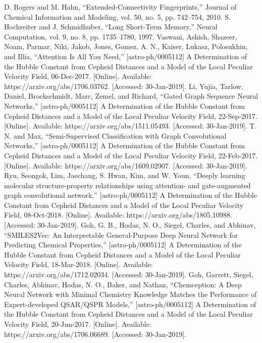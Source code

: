 \documentclass[conference]{IEEEtran}
\begin{document}
\begin{thebibliography}{}
	 D. Rogers and M. Hahn, “Extended-Connectivity Fingerprints,” Journal of Chemical Information and Modeling, vol. 50, no. 5, pp. 742–754, 2010.
	 S. Hochreiter and J. Schmidhuber, “Long Short-Term Memory,” Neural Computation, vol. 9, no. 8, pp. 1735–1780, 1997.
	 Vaswani, Ashish, Shazeer, Noam, Parmar, Niki, Jakob, Jones, Gomez, A. N., Kaiser, Lukasz, Polosukhin, and Illia, “Attention Is All You Need,” [astro-ph/0005112] A Determination of the Hubble Constant from Cepheid Distances and a Model of the Local Peculiar Velocity Field, 06-Dec-2017. [Online]. Available: https://arxiv.org/abs/1706.03762. [Accessed: 30-Jan-2019].
	 Li, Yujia, Tarlow, Daniel, Brockschmidt, Marc, Zemel, and Richard, “Gated Graph Sequence Neural Networks,” [astro-ph/0005112] A Determination of the Hubble Constant from Cepheid Distances and a Model of the Local Peculiar Velocity Field, 22-Sep-2017. [Online]. Available: https://arxiv.org/abs/1511.05493. [Accessed: 30-Jan-2019].
	 T. N. and Max, “Semi-Supervised Classification with Graph Convolutional Networks,” [astro-ph/0005112] A Determination of the Hubble Constant from Cepheid Distances and a Model of the Local Peculiar Velocity Field, 22-Feb-2017. [Online]. Available: https://arxiv.org/abs/1609.02907. [Accessed: 30-Jan-2019].
	 Ryu, Seongok, Lim, Jaechang, S. Hwan, Kim, and W. Youn, “Deeply learning molecular structure-property relationships using attention- and gate-augmented graph convolutional network,” [astro-ph/0005112] A Determination of the Hubble Constant from Cepheid Distances and a Model of the Local Peculiar Velocity Field, 08-Oct-2018. [Online]. Available: https://arxiv.org/abs/1805.10988. [Accessed: 30-Jan-2019].
	 Goh, G. B., Hodas, N. O., Siegel, Charles, and Abhinav, “SMILES2Vec: An Interpretable General-Purpose Deep Neural Network for Predicting Chemical Properties,” [astro-ph/0005112] A Determination of the Hubble Constant from Cepheid Distances and a Model of the Local Peculiar Velocity Field, 18-Mar-2018. [Online]. Available: https://arxiv.org/abs/1712.02034. [Accessed: 30-Jan-2019].
	 Goh, Garrett, Siegel, Charles, Abhinav, Hodas, N. O., Baker, and Nathan, “Chemception: A Deep Neural Network with Minimal Chemistry Knowledge Matches the Performance of Expert-developed QSAR/QSPR Models,” [astro-ph/0005112] A Determination of the Hubble Constant from Cepheid Distances and a Model of the Local Peculiar Velocity Field, 20-Jun-2017. [Online]. Available: https://arxiv.org/abs/1706.06689. [Accessed: 30-Jan-2019].

\end{thebibliography}
\end{document}
